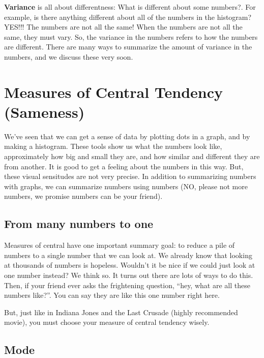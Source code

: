 \documentclass[]{book}
\begin{document}
\textbf{Variance} is all about differentness: What is different about some numbers?. For example, is there anything different about all of the numbers in the histogram? YES!!! The numbers are not all the same! When the numbers are not all the same, they must vary. So, the variance in the numbers refers to how the numbers are different. There are many ways to summarize the amount of variance in the numbers, and we discuss these very soon.

\hypertarget{measures-of-central-tendency-sameness}{%
\section{Measures of Central Tendency (Sameness)}\label{measures-of-central-tendency-sameness}}

We've seen that we can get a sense of data by plotting dots in a graph, and by making a histogram. These tools show us what the numbers look like, approximately how big and small they are, and how similar and different they are from another. It is good to get a feeling about the numbers in this way. But, these visual sensitudes are not very precise. In addition to summarizing numbers with graphs, we can summarize numbers using numbers (NO, please not more numbers, we promise numbers can be your friend).

\hypertarget{from-many-numbers-to-one}{%
\subsection{From many numbers to one}\label{from-many-numbers-to-one}}

Measures of central have one important summary goal: to reduce a pile of numbers to a single number that we can look at. We already know that looking at thousands of numbers is hopeless. Wouldn't it be nice if we could just look at one number instead? We think so. It turns out there are lots of ways to do this. Then, if your friend ever asks the frightening question, ``hey, what are all these numbers like?''. You can say they are like this one number right here.

But, just like in Indiana Jones and the Last Crusade (highly recommended movie), you must choose your measure of central tendency wisely.

\hypertarget{mode}{%
\subsection{Mode}\label{mode}}
\end{document}
